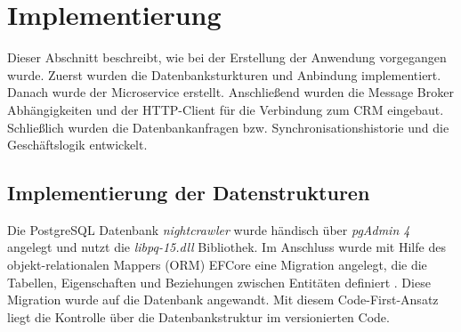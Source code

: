 \section{Implementierung} 
\label{sec:Implementierung}
Dieser Abschnitt beschreibt, wie bei der Erstellung der Anwendung vorgegangen wurde. 
Zuerst wurden die Datenbanksturkturen und Anbindung implementiert. Danach wurde der Microservice erstellt.
Anschließend wurden die Message Broker Abhängigkeiten und der HTTP-Client für die Verbindung zum \acs{CRM} eingebaut.
Schließlich wurden die Datenbankanfragen bzw. Synchronisationshistorie und die Geschäftslogik entwickelt.   


\subsection{Implementierung der Datenstrukturen}
\label{sec:ImplementierungDatenstrukturen}
Die PostgreSQL Datenbank \textit{nightcrawler} wurde händisch über \textit{pgAdmin 4} angelegt und nutzt die \textit{libpq-15.dll} Bibliothek. 
Im Anschluss wurde mit Hilfe des objekt-relationalen Mappers (\acs{ORM}) \acs{EFCore} eine Migration angelegt, die die Tabellen,
Eigenschaften und Beziehungen zwischen Entitäten definiert \cite{MicrosoftEfCoreDocs}. Diese Migration wurde auf die Datenbank angewandt.
Mit diesem Code-First-Ansatz liegt die Kontrolle über die Datenbankstruktur im versionierten Code.


